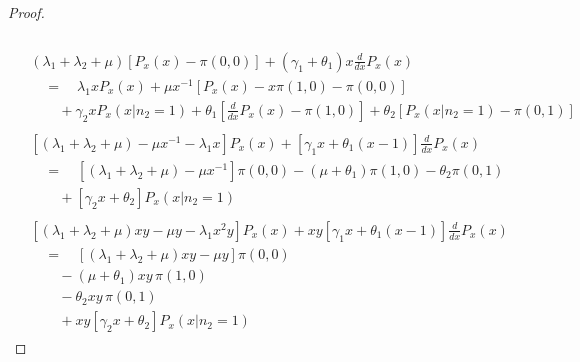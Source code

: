 \begin{proof}
\begin{align}
\begin{split}
        \end{split} \nonumber \\
        \begin{split}
            & (\lambda_1 + \lambda_2 + \mu) \left[ P_x(x) - \pi(0,0) \right]
            + (\gamma_1 + \theta_1) x \frac{d}{dx} P_x(x) \\
            & \quad = \quad \lambda_1 x P_x(x)
            + \mu x^{-1} \left[ P_x(x) - x \pi(1, 0) - \pi(0, 0) \right] \\
            & \quad \quad + \gamma_2 x P_x(x | n_2=1)
            + \theta_1 \left[ \frac{d}{dx} P_x(x) - \pi(1, 0) \right]
            + \theta_2 \left[ P_x(x | n_2=1) - \pi(0, 1) \right]
        \end{split} \nonumber \\
        \begin{split}
            & \left[ (\lambda_1 + \lambda_2 + \mu) - \mu x^{-1} - \lambda_1 x \right] P_x(x)
            + \left[ \gamma_1 x + \theta_1(x-1) \right] \frac{d}{dx} P_x(x) \\
            & \quad = \quad \left[ (\lambda_1 + \lambda_2 + \mu) - \mu x^{-1} \right] \pi(0,0)
            - (\mu + \theta_1) \pi(1, 0)
            - \theta_2 \pi(0, 1) \\
            & \quad \quad + \left[ \gamma_2 x + \theta_2 \right] P_x(x | n_2=1)
        \end{split} \nonumber \\
        \begin{split}
            & \left[ (\lambda_1 + \lambda_2 + \mu)xy - \mu y - \lambda_1 x^2 y \right] P_x(x)
            + xy \left[ \gamma_1 x + \theta_1(x-1) \right] \frac{d}{dx} P_x(x) \\
            & \quad = \quad \left[ (\lambda_1 + \lambda_2 + \mu)xy - \mu y \right] \pi(0,0) \\
            & \quad \quad - (\mu + \theta_1) xy \, \pi(1, 0) \\
            & \quad \quad - \theta_2 xy \, \pi(0, 1) \\
            & \quad \quad + xy \left[ \gamma_2 x + \theta_2 \right] P_x(x | n_2=1)
        \end{split} \label{eq:gen:transform_x_boundary}
    \end{align}
    

\end{proof}
